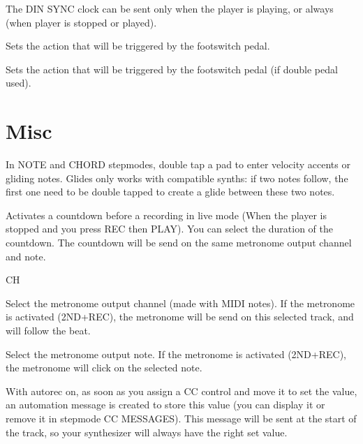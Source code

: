 The DIN SYNC clock can be sent only when the player is playing, or always (when player is stopped or played).

   

Sets the action that will be triggered by the footswitch pedal.

   

Sets the action that will be triggered by the footswitch pedal (if double pedal used).


\section{Misc}

  

In NOTE and CHORD stepmodes, double tap a pad to enter velocity accents or gliding notes. Glides only works with compatible synths: if two notes follow, the first one need to be double tapped to create a glide between these two notes.

     

Activates a countdown before a recording in live mode (When the player is stopped and you press REC then PLAY). You can select the duration of the countdown. The countdown will be send on the same metronome output channel and note.

 CH    \btn{\ldots} 

Select the metronome output channel (made with MIDI notes). If the metronome is activated (2ND+REC), the metronome will be send on this selected track, and will follow the beat.

  

Select the metronome output note. If the metronome is activated (2ND+REC), the metronome will click on the selected note.

  

With autorec on, as soon as you assign a CC control and move it to set the value, an automation message is created to store this value (you can display it or remove it in stepmode CC MESSAGES). This message will be sent at the start of the track, so your synthesizer will always have the right set value.

